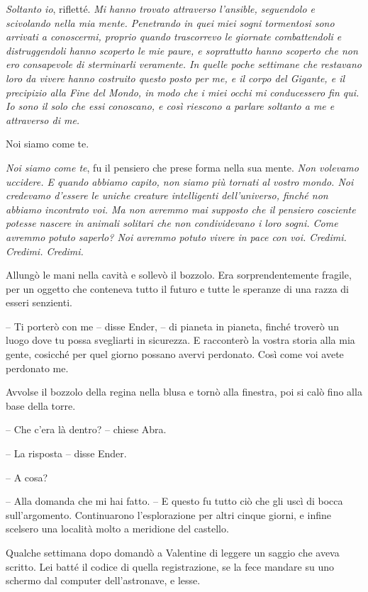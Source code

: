 \emph{{Soltanto io}}{, \emph{} rifletté. \emph{Mi hanno trovato
		attraverso l'ansible, seguendolo e scivolando nella mia mente.
		Penetrando in quei miei sogni tormentosi sono arrivati a conoscermi,
		proprio quando trascorrevo le giornate combattendoli e distruggendoli
		hanno scoperto le mie paure, e soprattutto hanno scoperto che non ero
		consapevole di sterminarli veramente. In quelle poche settimane che
		restavano loro da vivere hanno costruito questo posto per me, e il corpo
		del Gigante, e il precipizio alla Fine del Mondo, in modo che i miei
		occhi mi conducessero fin qui. Io sono il solo che essi conoscano, e
		così riescono a parlare soltanto a me e attraverso di me.}}

{Noi siamo come te.}

\emph{{Noi siamo come te}}{, \emph{} fu il pensiero che prese forma
	nella sua mente. \emph{Non volevamo uccidere. E quando abbiamo capito,
		non siamo più tornati al vostro mondo. Noi credevamo d'essere le uniche
		creature intelligenti dell'universo, finché non abbiamo incontrato voi.
		Ma non avremmo mai supposto che il pensiero cosciente potesse nascere in
		animali solitari che non condividevano i loro sogni. Come avremmo potuto
		saperlo? Noi avremmo potuto vivere in pace con voi. Credimi. Credimi.
		Credimi.}}

{Allungò le mani nella cavità e sollevò il bozzolo. Era
	sorprendentemente fragile, per un oggetto che conteneva tutto il futuro
	e tutte le speranze di una razza di esseri senzienti.}

{-- Ti porterò con me -- disse Ender, -- di pianeta in pianeta, finché
	troverò un luogo dove tu possa svegliarti in sicurezza. E racconterò la
	vostra storia alla mia gente, cosicché per quel giorno possano avervi
	perdonato. Così come voi avete perdonato me.}

{Avvolse il bozzolo della regina nella blusa e tornò alla finestra, poi
	si calò fino alla base della torre.}

{-- Che c'era là dentro? -- chiese Abra.}

{-- La risposta -- disse Ender.}

{-- A cosa?}

{-- Alla domanda che mi hai fatto. -- E questo fu tutto ciò che gli uscì
	di bocca sull'argomento. Continuarono l'esplorazione per altri cinque
	giorni, e infine scelsero una località molto a meridione del castello.}

{Qualche settimana dopo domandò a Valentine di leggere un saggio che
	aveva scritto. Lei batté il codice di quella registrazione, se la fece
	mandare su uno schermo dal computer dell'astronave, e lesse.}

